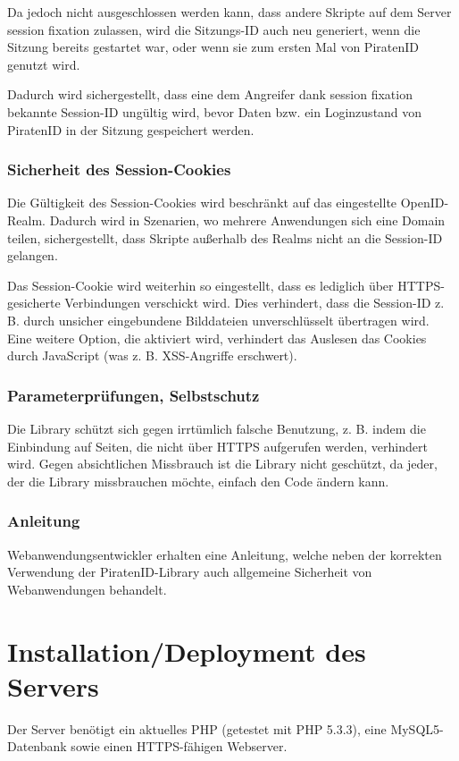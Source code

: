 Da jedoch nicht ausgeschlossen werden kann, dass andere Skripte auf dem Server session fixation zulassen,
wird die Sitzungs-ID auch neu generiert, wenn die Sitzung bereits gestartet war,
oder wenn sie zum ersten Mal von PiratenID genutzt wird.

Dadurch wird sichergestellt, dass eine dem Angreifer dank session fixation bekannte Session-ID ungültig wird,
bevor Daten bzw. ein Loginzustand von PiratenID in der Sitzung gespeichert werden.

\subsubsection{Sicherheit des Session-Cookies}
Die Gültigkeit des Session-Cookies wird beschränkt auf das eingestellte OpenID-Realm.
Dadurch wird in Szenarien, wo mehrere Anwendungen sich eine Domain teilen, sichergestellt,
dass Skripte außerhalb des Realms nicht an die Session-ID gelangen.

Das Session-Cookie wird weiterhin so eingestellt, dass es lediglich über HTTPS-gesicherte Verbindungen verschickt wird.
Dies verhindert, dass die Session-ID z. B. durch unsicher eingebundene Bilddateien unverschlüsselt übertragen wird.
Eine weitere Option, die aktiviert wird, verhindert das Auslesen das Cookies durch JavaScript (was z. B. XSS-Angriffe erschwert).

\subsubsection{Parameterprüfungen, Selbstschutz}
Die Library schützt sich gegen irrtümlich falsche Benutzung,
z. B. indem die Einbindung auf Seiten, die nicht über HTTPS aufgerufen werden, verhindert wird.
Gegen absichtlichen Missbrauch ist die Library nicht geschützt, da jeder, der die Library missbrauchen möchte, einfach den Code ändern kann.

\subsubsection{Anleitung}
Webanwendungsentwickler erhalten eine Anleitung, welche neben der korrekten Verwendung der PiratenID-Library auch allgemeine Sicherheit von Webanwendungen behandelt.


\newpage
\section{Installation/Deployment des Servers}
Der Server benötigt ein aktuelles PHP (getestet mit PHP 5.3.3), eine MySQL5-Datenbank sowie einen HTTPS-fähigen Webserver.

